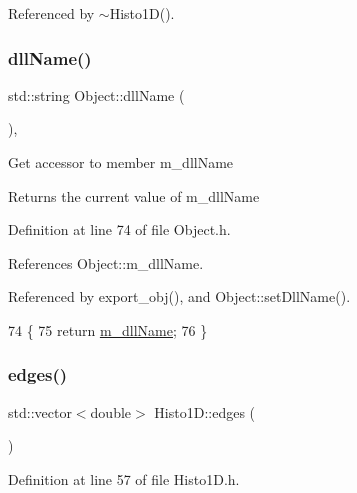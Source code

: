 Referenced by $\sim$\+Histo1\+D().

\mbox{\label{classObject_a2e3947f2870094c332d7454117f3ec63}} 
\subsubsection{\texorpdfstring{dll\+Name()}{dllName()}}
{\footnotesize\ttfamily std\+::string Object\+::dll\+Name (\begin{DoxyParamCaption}{ }\end{DoxyParamCaption})\hspace{0.3cm}{\ttfamily [inline]}, {\ttfamily [inherited]}}

Get accessor to member m\+\_\+dll\+Name \begin{DoxyReturn}{Returns}
the current value of m\+\_\+dll\+Name 
\end{DoxyReturn}


Definition at line 74 of file Object.\+h.



References Object\+::m\+\_\+dll\+Name.



Referenced by export\+\_\+obj(), and Object\+::set\+Dll\+Name().


\begin{DoxyCode}
74                        \{
75     \textcolor{keywordflow}{return} \hyperlink{classObject_a01afbeacebb8db6831559972ec362eb3}{m\_dllName};
76   \}  
\end{DoxyCode}
\mbox{\label{classHisto1D_a8c74413d35bce2e244defd470b6b4ebf}} 
\subsubsection{\texorpdfstring{edges()}{edges()}}
{\footnotesize\ttfamily std\+::vector$<$double$>$ Histo1\+D\+::edges (\begin{DoxyParamCaption}{ }\end{DoxyParamCaption})\hspace{0.3cm}{\ttfamily [inline]}}



Definition at line 57 of file Histo1\+D.\+h.



